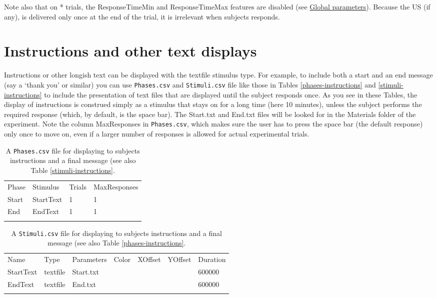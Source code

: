 \documentclass[11pt,]{article}
\renewcommand{\medskip}{}
\begin{document}
Note also that on * trials, the ResponseTimeMin and ResponseTimeMax
features are disabled (see \hyperref[global]{Global parameters}).
Because the US (if any), is delivered only once at the end of the trial,
it is irrelevant when subjects responds.

\section{Instructions and other text displays}

Instructions or other longish text can be displayed with the textfile
stimulus type. For example, to include both a start and an end message
(say a `thank you' or similar) you can use \texttt{Phases.csv} and
\texttt{Stimuli.csv} file like those in Tables \ref{phases-instructions}
and \ref{stimuli-instructions} to include the presentation of text files
that are displayed until the subject responds once. As you see in these
Tables, the display of instructions is construed simply as a stimulus
that stays on for a long time (here 10 minutes), unless the subject
performs the required response (which, by default, is the space bar).
The Start.txt and End.txt files will be looked for in the Materials
folder of the experiment. Note the column MaxResponses in
\texttt{Phases.csv}, which makes sure the user has to press the space
bar (the default response) only once to move on, even if a larger number
of responses is allowed for actual experimental trials.

\begin{table*}[t]\begin{center}\small\begin{tabular}{@{}llll@{}}
\hline\noalign{\medskip}
Phase & Stimulus & Trials & MaxResponses
\\\noalign{\medskip}
\hline\noalign{\medskip}
Start & StartText & 1 & 1
\\\noalign{\medskip}
End & EndText & 1 & 1
\\\noalign{\medskip}
\hline
\noalign{\medskip}
\end{tabular}\caption{A \texttt{Phases.csv} file for displaying to subjects
instructions and a final message (see also Table
\ref{stimuli-instructions}.}
\end{center}\end{table*}

\begin{table*}[t]\begin{center}\small\begin{tabular}{@{}lllllll@{}}
\hline\noalign{\medskip}
Name & Type & Parameters & Color & XOffset & YOffset & Duration
\\\noalign{\medskip}
\hline\noalign{\medskip}
StartText & textfile & Start.txt & & & & 600000
\\\noalign{\medskip}
EndText & textfile & End.txt & & & & 600000
\\\noalign{\medskip}
\hline
\noalign{\medskip}
\end{tabular}\caption{A \texttt{Stimuli.csv} file for displaying to subjects
instructions and a final message (see also Table
\ref{phases-instructions}.}
\end{center}\end{table*}
\end{document}
